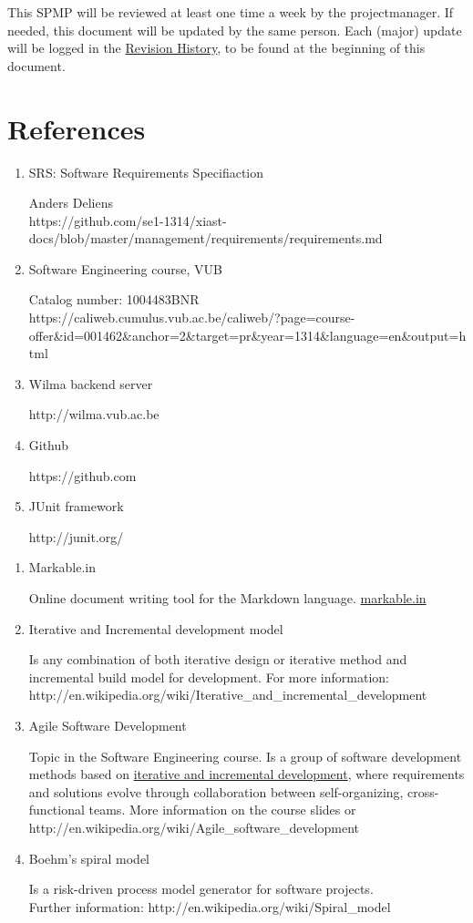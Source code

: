 \documentclass[9pt]{article}
\begin{document}
This SPMP will be reviewed at least one time a week by the
projectmanager. If needed, this document will be updated by the same
person. Each (major) update will be logged in the
\hyperref[RevisionHistory]{Revision History}, to be found at the
beginning of this document.

\section{References}\label{references}

\begin{enumerate}
\def\labelenumi{\arabic{enumi}.}
\item
  SRS: Software Requirements Specifiaction

  Anders Deliens\\
  https://github.com/se1-1314/xiast-docs/blob/master/management/requirements/requirements.md
\item
  Software Engineering course, VUB

  Catalog number: 1004483BNR\\
  https://caliweb.cumulus.vub.ac.be/caliweb/?page=course-\\offer\&id=001462\&anchor=2\&target=pr\&year=1314\&language=en\&output=html
\item
  Wilma backend server

  http://wilma.vub.ac.be
\item
  Github

  https://github.com
\item
  JUnit framework

  http://junit.org/
\end{enumerate}

\begin{enumerate}
\def\labelenumi{\arabic{enumi}.}
\setcounter{enumi}{8}
\item
  Markable.in

  Online document writing tool for the Markdown language.
  \url{markable.in}
\item
  Iterative and Incremental development model

  Is any combination of both iterative design or iterative method and
  incremental build model for development. For more information:\\
  http://en.wikipedia.org/wiki/Iterative\_and\_incremental\_development
\item
  Agile Software Development

  Topic in the Software Engineering course. Is a group of software
  development methods based on \hyperref[IterativeIncremental]{iterative
  and incremental development}, where requirements and solutions evolve
  through collaboration between self-organizing, cross-functional teams.
  More information on the course slides or
  http://en.wikipedia.org/wiki/Agile\_software\_development
\item
  Boehm's spiral model

  Is a risk-driven process model generator for software projects.\\
  Further information: http://en.wikipedia.org/wiki/Spiral\_model
\end{enumerate}
\clearpage
\end{document}
